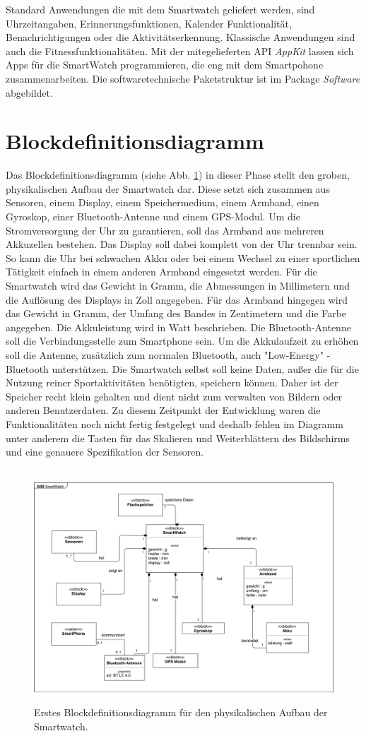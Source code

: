 Standard Anwendungen die mit dem Smartwatch geliefert werden, sind Uhrzeitangaben, Erinnerungsfunktionen, Kalender Funktionalität, Benachrichtigungen oder die Aktivitätserkennung. Klassische Anwendungen sind auch die Fitnessfunktionalitäten.
Mit der mitegelieferten API \textit{AppKit} lassen sich Apps für die SmartWatch programmieren, die eng mit dem Smartpohone zusammenarbeiten.
Die softwaretechnische Paketstruktur ist im Package \textit{Software} abgebildet.

\section{Blockdefinitionsdiagramm}


Das Blockdefinitionsdiagramm (siehe Abb. \ref{fig:block1}) in dieser Phase stellt den groben, physikalischen Aufbau der Smartwatch dar. Diese setzt sich zusammen aus Sensoren, einem Display, einem Speichermedium, einem Armband, einen Gyroskop, einer Bluetooth-Antenne und einem GPS-Modul. Um die Stromversorgung der Uhr zu garantieren, soll das Armband aus mehreren Akkuzellen bestehen. Das Display soll dabei komplett von der Uhr trennbar sein. So kann die Uhr bei schwachen Akku oder bei einem Wechsel zu einer sportlichen Tätigkeit einfach in einem anderen Armband eingesetzt werden. Für die Smartwatch wird das Gewicht in Gramm, die Abmessungen in Millimetern und die Auflösung des Displays in Zoll angegeben. Für das Armband hingegen wird das Gewicht in Gramm, der Umfang des Bandes in Zentimetern und die Farbe angegeben. Die Akkuleistung wird in Watt beschrieben. Die Bluetooth-Antenne soll die Verbindungsstelle zum Smartphone sein. Um die Akkulaufzeit zu erhöhen soll die Antenne, zusätzlich zum normalen Bluetooth, auch "Low-Energy" -Bluetooth unterstützen. Die Smartwatch selbst soll keine Daten, außer die für die Nutzung reiner Sportaktivitäten benötigten, speichern können. Daher ist der Speicher recht klein gehalten und dient nicht zum verwalten von Bildern oder anderen Benutzerdaten.
Zu diesem Zeitpunkt der Entwicklung waren die Funktionalitäten noch nicht fertig festgelegt und deshalb fehlen im Diagramm unter anderem die Tasten für das Skalieren und Weiterblättern des Bildschirms und eine genauere Spezifikation der Sensoren.

\begin{figure}[htb]
\centering\
\includegraphics[width=\textwidth]{img/block1}
\caption{Erstes Blockdefinitionsdiagramm für den physikalischen Aufbau der Smartwatch.}\label{fig:block1}
\end{figure}